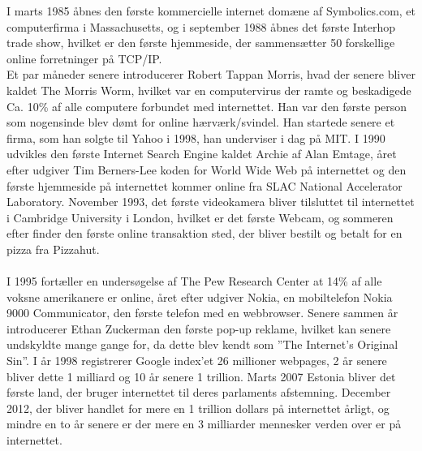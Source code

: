     I marts 1985 åbnes den første kommercielle internet domæne af Symbolics.com, et computerfirma i Massachusetts, og
    i september 1988 åbnes det første Interhop trade show, hvilket er den første hjemmeside, der sammensætter 50 forskellige online forretninger på TCP/IP.\\
    Et par måneder senere introducerer Robert Tappan Morris, hvad der senere bliver kaldet The Morris Worm, hvilket var en computervirus der ramte og beskadigede Ca. 10\% af alle computere forbundet med internettet. Han var den første person som nogensinde blev dømt for online hærværk/svindel. Han startede senere et firma, som han solgte til Yahoo i 1998, han underviser i dag på MIT. I 1990 udvikles den første Internet Search Engine kaldet Archie af Alan Emtage, året efter udgiver Tim Berners-Lee koden for World Wide Web på internettet og den første hjemmeside på internettet kommer online fra SLAC National Accelerator Laboratory. November 1993, det første videokamera bliver tilsluttet til internettet i Cambridge University i London, hvilket er det første Webcam, og sommeren efter finder den første online transaktion sted, der bliver bestilt og betalt for en pizza fra Pizzahut.\\\\
    I 1995 fortæller en undersøgelse af The Pew Research Center at 14\% af alle voksne amerikanere er online, året efter udgiver Nokia, en mobiltelefon Nokia 9000 Communicator, den første telefon med en webbrowser. Senere sammen år introducerer Ethan Zuckerman den første pop-up reklame, hvilket kan senere undskyldte mange gange for, da dette blev kendt som ”The Internet’s Original Sin”. I år 1998 registrerer Google index’et 26 millioner webpages, 2 år senere bliver dette 1 milliard og 10 år senere 1 trillion. Marts 2007 Estonia bliver det første land, der bruger internettet til deres parlaments afstemning. December 2012, der bliver handlet for mere en 1 trillion dollars på internettet årligt, og mindre en to år senere er der mere en 3 milliarder mennesker verden over er på internettet.\autocite{gilpress2015}\\
